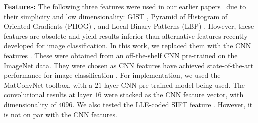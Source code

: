 









\textbf{Features:} The following three features were used in our
earlier papers~\citep{dai:eccv12b, dai:iccv13b} due to their simplicity and low dimensionality: GIST
\citep{gist}, Pyramid of Histogram of Oriented Gradients (PHOG)
\citep{Bosch:iccv07}, and Local Binary Patterns (LBP)
\citep{Ojala02}. However, these features are obsolete and yield
 results inferior than alternative features recently developed  for image
classification. 
In this work, we replaced them with the CNN features \citep{caffe14, deep:bmvc14}. 
These were obtained from an off-the-shelf CNN pre-trained on the ImageNet data. 
They were chosen as CNN features
have achieved state-of-the-art performance for image classification
\citep{nips12:cnn, cnnfet14}. For implementation, we used the
MatConvNet \citep{MatConvNet} toolbox, with a $21$-layer CNN
pre-trained model being used. The convolutional results at layer $16$ were
stacked as the CNN feature vector, with dimensionality of $4096$.  We
also tested the LLE-coded SIFT feature \citep{siftllc:cvpr10}. However,
it is not on par with the CNN features.
 
